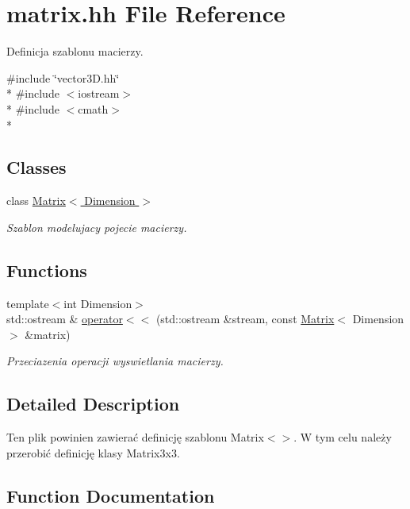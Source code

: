 \hypertarget{matrix_8hh}{}\section{matrix.\+hh File Reference}
\label{matrix_8hh}


Definicja szablonu macierzy.  


{\ttfamily \#include \char`\"{}vector3\+D.\+hh\char`\"{}}\\*
{\ttfamily \#include $<$iostream$>$}\\*
{\ttfamily \#include $<$cmath$>$}\\*
\subsection*{Classes}
\begin{DoxyCompactItemize}
\item 
class \hyperlink{class_matrix}{Matrix$<$ Dimension $>$}
\begin{DoxyCompactList}\small\item\em Szablon modelujacy pojecie macierzy. \end{DoxyCompactList}\end{DoxyCompactItemize}
\subsection*{Functions}
\begin{DoxyCompactItemize}
\item 
{\footnotesize template$<$int Dimension$>$ }\\std\+::ostream \& \hyperlink{matrix_8hh_a54082c3f4898e143dd88b1c8932e68b3}{operator$<$$<$} (std\+::ostream \&stream, const \hyperlink{class_matrix}{Matrix}$<$ Dimension $>$ \&matrix)
\begin{DoxyCompactList}\small\item\em Przeciazenia operacji wyswietlania macierzy. \end{DoxyCompactList}\end{DoxyCompactItemize}


\subsection{Detailed Description}
Ten plik powinien zawierać definicję szablonu Matrix$<$$>$. W tym celu należy przerobić definicję klasy Matrix3x3. 

\subsection{Function Documentation}
